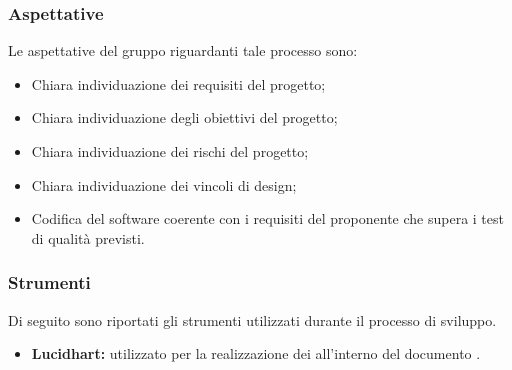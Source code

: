 \subsubsection{Aspettative}
Le aspettative del gruppo riguardanti tale processo sono:
\begin{itemize}
\item Chiara individuazione dei requisiti del progetto;
\item Chiara individuazione degli obiettivi del progetto;
\item Chiara individuazione dei rischi del progetto;
\item Chiara individuazione dei vincoli di design;
\item Codifica del software coerente con i requisiti del proponente che supera i test di qualità previsti.
\end{itemize}





\subsubsection{Strumenti}\label{PS_Strumenti}
Di seguito sono riportati gli strumenti utilizzati durante il processo di sviluppo.
\begin{itemize}
	\item \textbf{Lucidhart:} utilizzato per la realizzazione dei  all'interno del documento .
\end{itemize}
\newpage